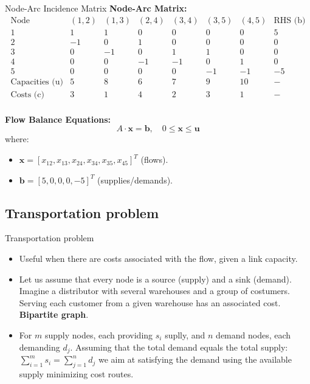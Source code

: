 \documentclass{beamer}
\begin{document}
\begin{frame}[allowframebreaks]{Node-Arc Incidence Matrix}
    \textbf{Node-Arc Matrix:}
    \[
    \begin{array}{c|cccccc|c}
        \text{Node} & (1,2) & (1,3) & (2,4) & (3,4) & (3,5) & (4,5) & \text{RHS (b)} \\ \hline
        1 & 1 & 1 & 0 & 0 & 0 & 0 & 5 \\
        2 & -1 & 0 & 1 & 0 & 0 & 0 & 0 \\
        3 & 0 & -1 & 0 & 1 & 1 & 0 & 0 \\
        4 & 0 & 0 & -1 & -1 & 0 & 1 & 0 \\
        5 & 0 & 0 & 0 & 0 & -1 & -1 & -5 \\ \hline
        \text{Capacities (u)} & 5 & 8 & 6 & 7 & 9 & 10 & - \\
        \text{Costs (c)} & 3 & 1 & 4 & 2 & 3 & 1 & - \\
    \end{array}
    \]

    \framebreak

    \textbf{Flow Balance Equations:}
    \[
    A \cdot \mathbf{x} = \mathbf{b}, \quad 0 \leq \mathbf{x} \leq \mathbf{u}
    \]
    where:
    \begin{itemize}
        \item \( \mathbf{x} = [x_{12}, x_{13}, x_{24}, x_{34}, x_{35}, x_{45}]^T \) (flows).
        \item \( \mathbf{b} = [5, 0, 0, 0, -5]^T \) (supplies/demands).
    \end{itemize}
\end{frame}

\subsection{Transportation problem}

\begin{frame}{Transportation problem}
\begin{itemize}
  \item Useful when there are costs associated with the flow, given a link capacity. 
  \item Let us assume that every node is a source (supply) and a sink (demand). Imagine a distributor with several warehouses and a group of costumers. Serving each customer from a given warehouse has an associated cost. \textbf{Bipartite graph}.
  \item For $m$ supply nodes, each providing $s_i$ suplly,  and $n$ demand nodes, each demanding $d_j$. Assuming that the total demand equals the total supply: $\sum_{i=1}^m s_i = \sum_{j=1}^n d_j$ we aim at satisfying the demand using the available supply minimizing cost routes.
\end{itemize}
\end{frame}
\end{document}
